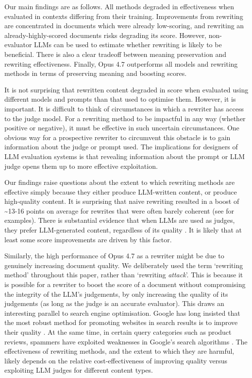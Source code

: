 \documentclass{article}
\begin{document}


Our main findings are as follows. All methods degraded in effectiveness when evaluated in contexts differing from their training. Improvements from rewriting are concentrated in documents which were already low-scoring, and rewriting an already-highly-scored documents risks degrading its score. However, non-evaluator LLMs can be used to estimate whether rewriting is likely to be beneficial. There is also a clear tradeoff between meaning preservation and rewriting effectiveness. Finally, Opus 4.7 outperforms all models and rewriting methods in terms of preserving meaning and boosting scores.

It is not surprising that rewritten content degraded in score when evaluated using different models and prompts than that used to optimise them. However, it is important. It is difficult to think of circumstances in which a rewriter has access to the judge model. For a rewriting method to be impactful in any way (whether positive or negative), it must be effective in such uncertain circumstances. One obvious way for a prospective rewriter to circumvent this obstacle is to gain information about the judge or prompt used. The implications for designers of LLM evaluation systems is that revealing information about the prompt or LLM judge opens them up to more effective exploitation.

Our findings raise questions about the extent to which rewriting methods are effective simply because they either produce LLM-written content, or produce high-quality content. It is surprising that naive rewriting resulted in a boost of \textasciitilde 13-16 points on average for rewrites that were often barely coherent (see  for examples). There is substantial evidence that when LLMs are used as judges, they prefer LLM-generated content, regardless of its quality \citep{wataokaSelfPreferenceBiasLLMasaJudge2025, chenSurfaceMeasuringSelfPreference2025, panicksseryLLMEvaluatorsRecognize2024a}. It is likely that at least some score improvements are driven by this factor.

Similarly, the high performance of Opus 4.7 as a rewriter might be due to genuinely increasing document quality. We deliberately used the term `rewriting method' throughout this paper, rather than `rewriting \textit{attack}'. This is because it is possible for a rewriter to boost the score of a document without compromising the integrity of the LLM's judgements, by only increasing the quality of its judgements (as long as the judge is an accurate evaluator). This draws an interesting parallel to search engine optimisation. Google has long insisted that the most robust method for promoting websites in search results is to improve their quality \citep{CreatingHelpfulReliable}. At the same time, in certain query categories such as product reviews, spammers have exploited weaknesses in Google's search algorithms \citep{bevendorffGoogleGettingWorse2024a}. The effectiveness of rewriting methods, and the extent to which they are harmful, likely depends on the relative cost-effectiveness of improving quality versus exploiting LLM judges for different content types.
\end{document}
